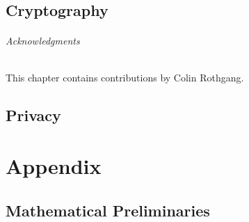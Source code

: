 \documentclass{book}
\begin{document}
  \chapter{Cryptography}

  \paragraph{Acknowledgments}
  This chapter contains contributions by Colin Rothgang.
  
    


  \chapter{Privacy}

%
%  

\part{Appendix}

\appendix

\chapter{Mathematical Preliminaries}\label{sec:math}


\tocentryBib

%


\end{document}
